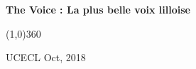 \documentclass[11pt,fleqn]{book} %
\newcommand{\misoline}{
\vspace{-1.5em}
\begin{center}
\line(1,0){360}
\end{center}
}
\begin{document}

\begingroup
\thispagestyle{empty}
\centering
\vspace*{5cm}
\begin{mytransparentbox}[height=3cm]
\par\normalfont\fontsize{30}{30}\sffamily\selectfont
\centering\textbf{The Voice : La plus belle voix lilloise}\\
\vspace*{0.5cm}
\misoline
\vspace*{-0.3cm}
\par\normalfont\fontsize{25}{25}\sffamily\selectfont
\hspace{0cm}UCECL \hspace{5.5cm}Oct, 2018
\end{mytransparentbox}
\endgroup

\end{document}
